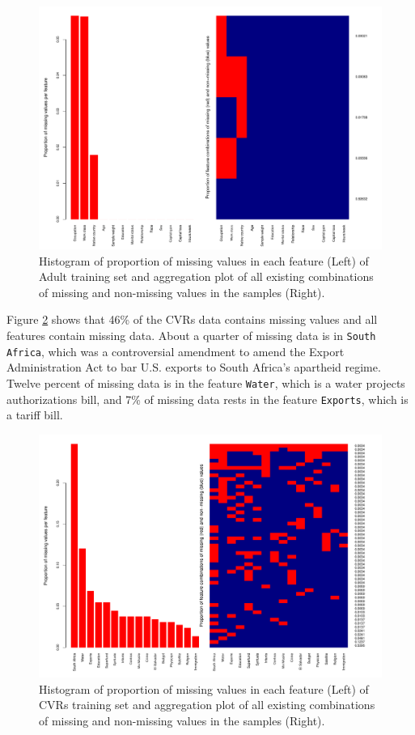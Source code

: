 \documentclass[10pt]{book}
\theoremstyle{definition}
\begin{document}
\begin{figure}[h!]
\includegraphics [scale=0.45]{figure/proportion-missing-adult.pdf}\par
\caption{\footnotesize Histogram of proportion of missing values in each feature (Left) of Adult training set and aggregation plot of all existing combinations of missing and non-missing values in the samples (Right).}
 \label{fig:proportion-missing-adult}
\end{figure}

Figure \ref{fig:proportion-missing-votes} shows that 46\% of the CVRs data contains missing values and all features contain missing data. About a quarter of missing data is in \texttt{South Africa}, which was a controversial amendment to amend the Export Administration Act to bar U.S. exports to South Africa's apartheid regime. Twelve percent of missing data is in the feature \texttt{Water}, which is a water projects authorizations bill, and 7\% of missing data rests in the feature \texttt{Exports}, which is a tariff bill. 

\begin{figure}[h!]
\includegraphics [scale=0.45]{figure/proportion-missing-votes.pdf}\par
\caption{\footnotesize Histogram of proportion of missing values in each feature (Left) of CVRs training set and aggregation plot of all existing combinations of missing and non-missing values in the samples (Right).}
 \label{fig:proportion-missing-votes}
\end{figure}
\end{document}
